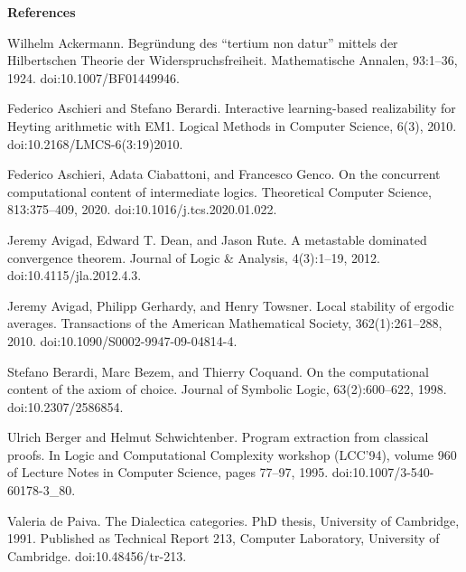
 
\par\medskip\noindent\textbf{References}\par
  
\par\noindent  [1]  Wilhelm Ackermann.  Begründung des “tertium non datur” mittels der Hilbertschen Theorie der Widerspruchsfreiheit.  Mathematische Annalen, 93:1–36, 1924.  doi:10.1007/BF01449946.  
 
\par\noindent  [2]  Federico Aschieri and Stefano Berardi.  Interactive learning-based realizability for Heyting arithmetic with EM1.  Logical Methods in Computer Science, 6(3), 2010.  doi:10.2168/LMCS-6(3:19)2010.  
 
\par\noindent  [3]  Federico Aschieri, Adata Ciabattoni, and Francesco Genco.  On the concurrent computational content of intermediate logics.  Theoretical Computer Science, 813:375–409, 2020.  doi:10.1016/j.tcs.2020.01.022.  
 
\par\noindent  [4]  Jeremy Avigad, Edward T. Dean, and Jason Rute.  A metastable dominated convergence theorem.  Journal of Logic \& Analysis, 4(3):1–19, 2012.  doi:10.4115/jla.2012.4.3.  
 
\par\noindent  [5]  Jeremy Avigad, Philipp Gerhardy, and Henry Towsner.  Local stability of ergodic averages.  Transactions of the American Mathematical Society, 362(1):261–288, 2010.  doi:10.1090/S0002-9947-09-04814-4.  
 
\par\noindent  [6]  Stefano Berardi, Marc Bezem, and Thierry Coquand.  On the computational content of the axiom of choice.  Journal of Symbolic Logic, 63(2):600–622, 1998.  doi:10.2307/2586854.  
 
\par\noindent  [7]  Ulrich Berger and Helmut Schwichtenber.  Program extraction from classical proofs.  In Logic and Computational Complexity workshop (LCC’94), volume 960 of Lecture Notes in Computer Science, pages 77–97, 1995.  doi:10.1007/3-540-60178-3\_80.  
 
\par\noindent  [8]  Valeria de Paiva.  The Dialectica categories.  PhD thesis, University of Cambridge, 1991.  Published as Technical Report 213, Computer Laboratory, University of Cambridge.  doi:10.48456/tr-213.  
 
